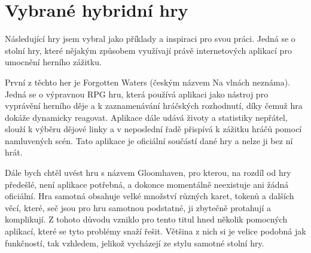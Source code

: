 \section{Vybrané hybridní hry}
Následující hry jsem vybral jako příklady a inspiraci pro svou práci. Jedná se o stolní hry, které nějakým způsobem využívají právě internetových aplikací pro umocnění herního zážitku.

První z těchto her je Forgotten Waters (českým názvem Na vlnách neznáma). Jedná se o výpravnou RPG hru, která používá aplikaci jako nástroj pro vyprávění herního děje a k zaznamenávání hráčských rozhodnutí, díky čemuž hra dokáže dynamicky reagovat. Aplikace dále udává životy a statistiky nepřátel, slouží k výběru dějové linky a v neposlední řadě přispívá k zážitku hráčů pomocí namluvených scén. Tato aplikace je oficiální součástí dané hry a nelze ji bez ní hrát.

Dále bych chtěl uvést hru s názvem Gloomhaven, pro kterou, na rozdíl od hry předešlé, není aplikace potřebná, a dokonce momentálně neexistuje ani žádná oficiální. Hra samotná obsahuje velké množství různých karet, tokenů a dalších věcí, které, seč jsou pro hru samotnou podstatné, ji zbytečně protahují a komplikují. Z tohoto důvodu vzniklo pro tento titul hned několik pomocných aplikací, které se tyto problémy snaží řešit. Většina z nich si je velice podobná jak funkčností, tak vzhledem, jelikož vycházejí ze stylu samotné stolní hry.